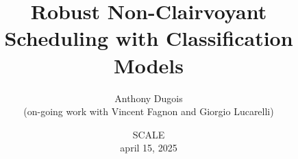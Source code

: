 \documentclass[aspectratio=169]{beamer}
\title{Robust Non-Clairvoyant Scheduling with Classification Models}
\author{Anthony Dugois \\ \footnotesize (on-going work with Vincent Fagnon and Giorgio Lucarelli)}
\institute{Université Marie et Louis Pasteur, institut FEMTO-ST, Besançon}
\date{SCALE \\ \footnotesize april 15, 2025}
\begin{document}
\frame{\titlepage}
\end{document}
